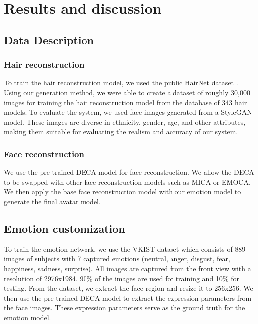 \section{Results and discussion}
\label{sec:results}

\subsection{Data Description}
\subsubsection{Hair reconstruction}
To train the hair reconstruction model, we used the public HairNet dataset \cite{zhouHairNetSingleViewHair2018}. Using our generation method, we were able to create a dataset of roughly 30,000 images for training the hair reconstruction model from the database of 343 hair models.
To evaluate the system, we used face images generated from a StyleGAN \cite{karrasStyleBasedGeneratorArchitecture2019} model. These images are diverse in ethnicity, gender, age, and other attributes, making them suitable for evaluating the realism and accuracy of our system.
\subsubsection{Face reconstruction}
We use the pre-trained DECA model for face reconstruction. We allow the DECA to be swapped with other face reconstruction models such as MICA \cite{zielonkaMetricalReconstructionHuman2022} or EMOCA. We then apply the base face reconstruction model with our emotion model to generate the final avatar model.

\subsection{Emotion customization}
To train the emotion network, we use the VKIST dataset which consists of 889 images of subjects with 7 captured emotions (neutral, anger, disgust, fear, happiness, sadness, surprise). All images are captured from the front view with a resolution of 2976x1984. 90\% of the images are used for training and 10\% for testing. From the dataset, we extract the face region and resize it to 256x256. We then use the pre-trained DECA model to extract the expression parameters from the face images. These expression parameters serve as the ground truth for the emotion model.

